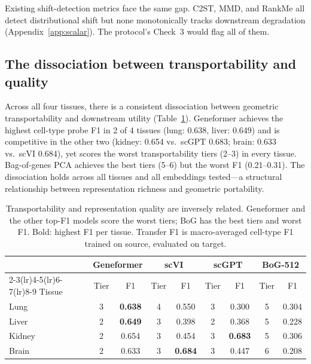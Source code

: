 \documentclass[10pt,letterpaper]{article}
\begin{document}
Existing shift-detection metrics face the same gap. C2ST, MMD, and RankMe all detect distributional shift but none monotonically tracks downstream degradation (Appendix~\ref{app:scalar}). The protocol's Check~3 would flag all of them.


\subsection{The dissociation between transportability and quality}
\label{sec:dissociation}

Across all four tissues, there is a consistent dissociation between geometric transportability and downstream utility (Table~\ref{tab:dissociation}). Geneformer achieves the highest cell-type probe F1 in 2 of 4 tissues (lung: 0.638, liver: 0.649) and is competitive in the other two (kidney: 0.654 vs.\ scGPT 0.683; brain: 0.633 vs.\ scVI 0.684), yet scores the worst transportability tiers (2--3) in every tissue. Bag-of-genes PCA achieves the best tiers (5--6) but the worst F1 (0.21--0.31). The dissociation holds across all tissues and all embeddings tested---a structural relationship between representation richness and geometric portability.

\begin{table}[t]
\centering
\caption{Transportability and representation quality are inversely related. Geneformer and the other top-F1 models score the worst tiers; BoG has the best tiers and worst F1. Bold: highest F1 per tissue. Transfer F1 is macro-averaged cell-type F1 trained on source, evaluated on target.}
\label{tab:dissociation}
\small
\begin{tabular}{@{}lcccccccc@{}}
\toprule
 & \multicolumn{2}{c}{Geneformer} & \multicolumn{2}{c}{scVI} & \multicolumn{2}{c}{scGPT} & \multicolumn{2}{c}{BoG-512} \\
\cmidrule(lr){2-3}\cmidrule(lr){4-5}\cmidrule(lr){6-7}\cmidrule(lr){8-9}
Tissue & Tier & F1 & Tier & F1 & Tier & F1 & Tier & F1 \\
\midrule
Lung   & 3 & \textbf{0.638} & 4 & 0.550 & 3 & 0.300 & 5 & 0.304 \\
Liver  & 2 & \textbf{0.649} & 3 & 0.398 & 2 & 0.368 & 5 & 0.228 \\
Kidney & 2 & 0.654 & 3 & 0.454 & 3 & \textbf{0.683} & 5 & 0.306 \\
Brain  & 2 & 0.633 & 3 & \textbf{0.684} & 3 & 0.447 & 6 & 0.208 \\
\bottomrule
\end{tabular}
\end{table}
\end{document}
